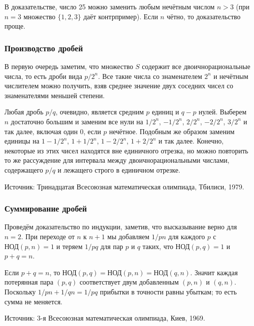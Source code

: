 В доказательстве, число 25 можно заменить любым нечётным числом $n> 3$ (при $n=3$ множество $\{1,2,3\}$ даёт контрпример).
Если $n$ чётно, то доказательство проще. 


\subsubsection*{Производство дробей}%

В первую очередь заметим, что множество $S$ содержит все двоичнорациональные числа, 
то есть дроби вида $p/2^n$.
Все такие числа со знаменателем $2^n$ и нечётным числителем можно получить, взяв среднее значение двух соседних чисел со знаменателями меньшей степени.

Любая дробь $p/q$, очевидно, является средним $p$ единиц и $q-p$ нулей.
Выберем $n$ достаточно большим и заменим все нули на $1/2^n$, $-1/2^n$, $2/2^n$, $-2/2^n$, $3/2^n$ и так далее, включая один $0$, если $p$ нечётное.
Подобным же образом заменим единицы на $1-1/2^n$, $1+1/2^n$, $1-2/2^n$, $1+2/2^n$ и так далее.
Конечно, некоторые из этих чисел находятся вне единичного отрезка, но можно повторить то же рассуждение для интервала между двоичнорациональными числами, содержащего $p/q$ и лежащего строго в единичном отрезке.%
\heart

Источник: Тринадцатая Всесоюзная математическая олимпиада, Тбилиси, 1979.

\subsubsection*{Суммирование дробей}%

Проведём доказательство по индукции, заметив, что высказывание верно для $n=2$.
При переходе от $n$ к $n+1$ мы добавляем $1/pn$ для каждого $p$ с $\text{НОД}(p,n)=1$ и теряем $1/pq$ для пар $p$ и $q$ таких, что $\text{НОД}(p,q)=1$ и $p+q=n$.

Если $p+q=n$, то
$\text{НОД}(p,q)=\text{НОД}(p,n)=\text{НОД}(q,n)$.
Значит каждая потерянная пара $(p,q)$ соответствует двум добавленным $(p,n)$ и $(q,n)$.
Поскольку $1/pn+1/qn=1/pq$ прибытки в точности равны  убыткам; то есть сумма не меняется.
\heart

Источник: 3-я Всесоюзная математическая олимпиада, Киев, 1969.

